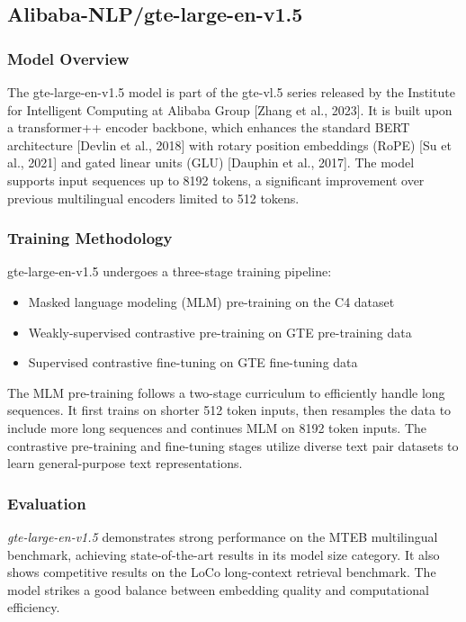 \subsection{Alibaba-NLP/gte-large-en-v1.5}\label{subsec:alibaba-nlp}

\subsubsection{Model Overview}
The gte-large-en-v1.5 model is part of the gte-vl.5 series released by the Institute for Intelligent Computing at Alibaba Group [Zhang et al., 2023].
It is built upon a transformer++ encoder backbone, which enhances the standard BERT architecture [Devlin et al., 2018] with rotary position embeddings (RoPE) [Su et al., 2021] and gated linear units (GLU) [Dauphin et al., 2017].
The model supports input sequences up to 8192 tokens, a significant improvement over previous multilingual encoders limited to 512 tokens.

\subsubsection{Training Methodology}
gte-large-en-v1.5 undergoes a three-stage training pipeline:
\begin{itemize}
    \item Masked language modeling (MLM) pre-training on the C4 dataset
    \item Weakly-supervised contrastive pre-training on GTE pre-training data
    \item Supervised contrastive fine-tuning on GTE fine-tuning data
\end{itemize}

The MLM pre-training follows a two-stage curriculum to efficiently handle long sequences.
It first trains on shorter 512 token inputs, then resamples the data to include more long sequences and continues MLM on 8192 token inputs.
The contrastive pre-training and fine-tuning stages utilize diverse text pair datasets to learn general-purpose text representations.

\subsubsection{Evaluation}
\textit{gte-large-en-v1.5} demonstrates strong performance on the MTEB multilingual benchmark, achieving state-of-the-art results in its model size category.
It also shows competitive results on the LoCo long-context retrieval benchmark.
The model strikes a good balance between embedding quality and computational efficiency.

